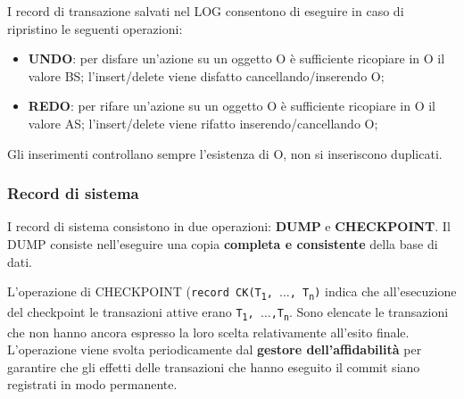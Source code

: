 \documentclass[11pt]{report}
\begin{document}
I record di transazione salvati nel LOG consentono di eseguire in caso di ripristino le seguenti operazioni:
\begin{itemize}
\item \textbf{UNDO}: per disfare un'azione su un oggetto O \`e sufficiente ricopiare in O il valore BS; l'insert/delete viene disfatto cancellando/inserendo O;
\item \textbf{REDO}: per rifare un'azione su un oggetto O \`e sufficiente ricopiare in O il valore AS; l'insert/delete viene rifatto inserendo/cancellando O;
\end{itemize}
Gli inserimenti controllano sempre l'esistenza di O, non si inseriscono duplicati.


\subsubsection{Record di sistema}
 
I record di sistema consistono in due operazioni: \textbf{DUMP} e \textbf{CHECKPOINT}.  Il DUMP consiste nell'eseguire una copia \textbf{completa e consistente} della base di dati. 

L'operazione di CHECKPOINT (\texttt{record CK(T\textsubscript{1}, $\dots$, T\textsubscript{n})} indica che all'esecuzione del checkpoint le transazioni attive erano \texttt{T\textsubscript{1}, $\dots$,T\textsubscript{n}}. Sono elencate le transazioni che non hanno ancora espresso la loro scelta relativamente all'esito finale. L'operazione viene svolta periodicamente dal \textbf{gestore dell'affidabilit\`a} per garantire che gli effetti delle transazioni che hanno eseguito il commit siano registrati in modo permanente. 

\end{document}
